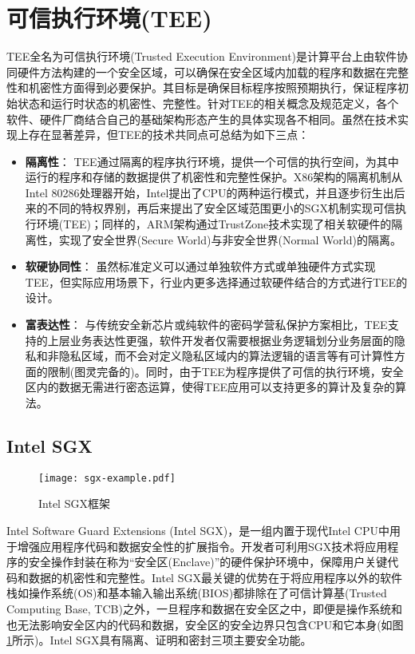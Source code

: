 \section{可信执行环境(TEE)}
\label{sec:background-tee}

TEE全名为可信执行环境(Trusted Execution Environment)是计算平台上由软件协同硬件方法构建的一个安全区域，可以确保在安全区域内加载的程序和数据在完整性和机密性方面得到必要保护。其目标是确保目标程序按照预期执行，保证程序初始状态和运行时状态的机密性、完整性。针对TEE的相关概念及规范定义，各个软件、硬件厂商结合自己的基础架构形态产生的具体实现各不相同。虽然在技术实现上存在显著差异，但TEE的技术共同点可总结为如下三点：

\begin{itemize}[leftmargin=*]
    \item \textbf{隔离性}：
          TEE通过隔离的程序执行环境，提供一个可信的执行空间，为其中运行的程序和存储的数据提供了机密性和完整性保护。X86架构的隔离机制从Intel 80286处理器开始，Intel提出了CPU的两种运行模式，并且逐步衍生出后来的不同的特权界别，再后来提出了安全区域范围更小的SGX机制实现可信执行环境(TEE)；同样的，ARM架构通过TrustZone技术实现了相关软硬件的隔离性，实现了安全世界(Secure World)与非安全世界(Normal World)的隔离。
    \item \textbf{软硬协同性}：
          虽然标准定义可以通过单独软件方式或单独硬件方式实现TEE，但实际应用场景下，行业内更多选择通过软硬件结合的方式进行TEE的设计。
    \item \textbf{富表达性}：
          与传统安全新芯片或纯软件的密码学营私保护方案相比，TEE支持的上层业务表达性更强，软件开发者仅需要根据业务逻辑划分业务层面的隐私和非隐私区域，而不会对定义隐私区域内的算法逻辑的语言等有可计算性方面的限制(图灵完备的)。同时，由于TEE为程序提供了可信的执行环境，安全区内的数据无需进行密态运算，使得TEE应用可以支持更多的算计及复杂的算法。
\end{itemize}

\subsection{Intel SGX}
\label{subsec:background-tee-sgx}

\begin{figure}[!htb]
    \small
    \centering
    \texttt{[image: sgx-example.pdf]}
    \caption{Intel SGX框架}
    \label{fig:sgx-arch}
\end{figure}

Intel Software Guard Extensions (Intel SGX)\cite{sgx,sgx2}，是一组内置于现代Intel CPU中用于增强应用程序代码和数据安全性的扩展指令。开发者可利用SGX技术将应用程序的安全操作封装在称为“安全区(Enclave)”的硬件保护环境中，保障用户关键代码和数据的机密性和完整性。Intel SGX最关键的优势在于将应用程序以外的软件栈如操作系统(OS)和基本输入输出系统(BIOS)都排除在了可信计算基(Trusted Computing Base, TCB)之外，一旦程序和数据在安全区之中，即便是操作系统和也无法影响安全区内的代码和数据，安全区的安全边界只包含CPU和它本身(如图\ref{fig:sgx-arch}所示)。Intel SGX具有隔离、证明和密封三项主要安全功能。

